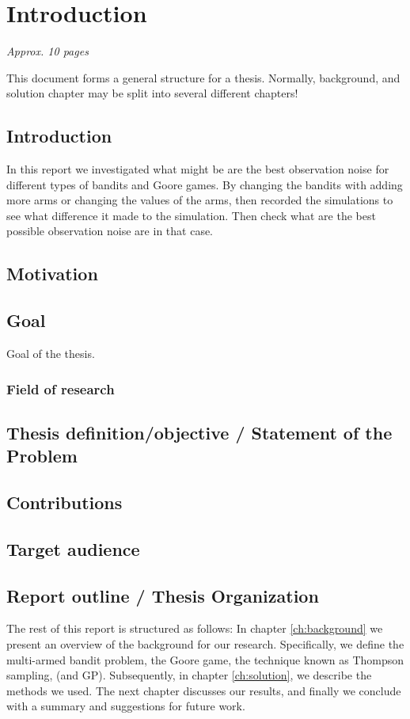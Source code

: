 \chapter{Introduction}
\label{ch:introduction}

\textit{Approx. 10 pages}

This document forms a general structure for a thesis.
Normally, background, and solution chapter may be split into several different chapters!

\section{Introduction}
In this report we investigated what might be are the best observation noise for different 
types of bandits and Goore games. By changing the bandits with adding more arms or changing the values 
of the arms, then recorded the simulations to see what difference it made to the simulation. Then check 
what are the best possible observation noise are in that case.
\section{Motivation}

\section{Goal}
Goal of the thesis.

\subsection{Field of research}

\section{Thesis definition/objective / Statement of the Problem}

\section{Contributions}
 
\section{Target audience}


\section{Report outline / Thesis Organization}

The rest of this report is structured as follows: In chapter
\ref{ch:background} we present an overview of the background for our research.
Specifically, we define the multi-armed bandit problem, the Goore game, the
technique known as Thompson sampling, (and GP). Subsequently, in chapter
\ref{ch:solution}, we describe the methods we used. The next chapter discusses
our results, and finally we conclude with a summary and suggestions for future
work.
